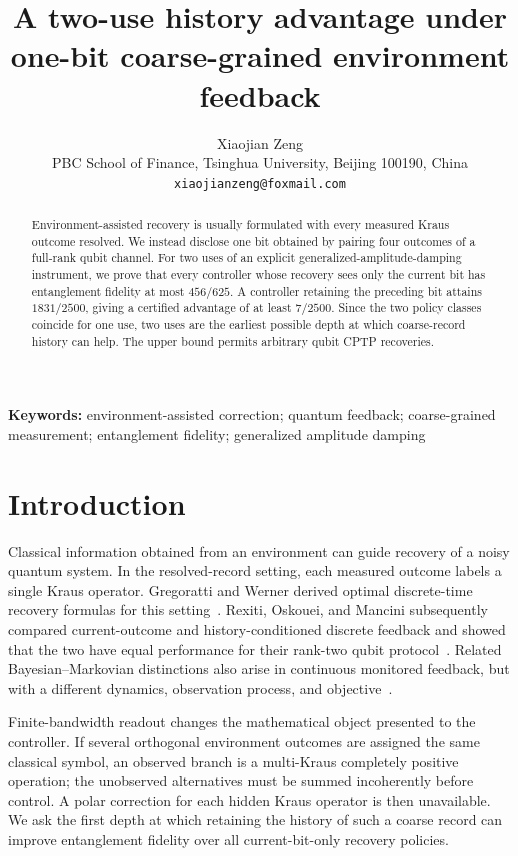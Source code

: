 \documentclass[11pt]{article}
\title{A two-use history advantage under one-bit coarse-grained environment feedback}
\author{Xiaojian Zeng\\
\small PBC School of Finance, Tsinghua University, Beijing 100190, China\\
\small \texttt{xiaojianzeng@foxmail.com}}
\date{}
\begin{document}
\maketitle

\begin{abstract}
Environment-assisted recovery is usually formulated with every measured Kraus outcome
resolved.  We instead disclose one bit obtained by pairing four outcomes of a full-rank
qubit channel.  For two uses of an explicit generalized-amplitude-damping instrument,
we prove that every controller whose recovery sees only the current bit has
entanglement fidelity at most $456/625$.  A controller retaining the preceding bit
attains $1831/2500$, giving a certified advantage of at least $7/2500$.  Since the two
policy classes coincide for one use, two uses are the earliest possible depth at which
coarse-record history can help.  The upper bound permits arbitrary qubit CPTP
recoveries.
\end{abstract}

\noindent\textbf{Keywords:} environment-assisted correction; quantum feedback;
coarse-grained measurement; entanglement fidelity; generalized amplitude damping

\section{Introduction}

Classical information obtained from an environment can guide recovery of a noisy
quantum system.  In the resolved-record setting, each measured outcome labels a single
Kraus operator.  Gregoratti and Werner derived optimal discrete-time recovery formulas
for this setting~\cite{GregorattiWerner2004}.  Rexiti, Oskouei, and Mancini subsequently
compared current-outcome and history-conditioned discrete feedback and showed that the
two have equal performance for their rank-two qubit protocol~\cite{RexitiEtAl2024}.
Related Bayesian--Markovian distinctions also arise in continuous monitored feedback,
but with a different dynamics, observation process, and objective~\cite{WisemanEtAl2002}.

Finite-bandwidth readout changes the mathematical object presented to the controller.
If several orthogonal environment outcomes are assigned the same classical symbol, an
observed branch is a multi-Kraus completely positive operation; the unobserved
alternatives must be summed incoherently before control.  A polar correction for each
hidden Kraus operator is then unavailable.  We ask the first depth at which retaining
the history of such a coarse record can improve entanglement fidelity over all
current-bit-only recovery policies.
\end{document}
